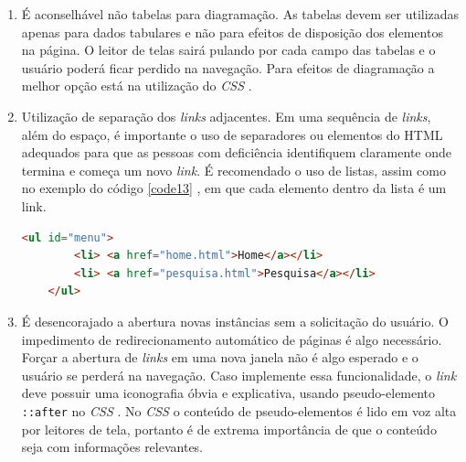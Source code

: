 {\begin{enumerate}
{\begin{lstlisting}[language=html,caption={Criação de \textit{landmarks} para acessar pontos de referências através do atalho p}, label=code12]
        <div role="main" id="conteudo"> conteúdo da main </mdiv>
        \end{lstlisting}}
    \item É aconselhável não tabelas para diagramação. As tabelas devem ser utilizadas apenas para dados tabulares e não para efeitos de disposição dos elementos na página. O leitor de telas sairá pulando por cada campo das tabelas e o usuário poderá ficar perdido na navegação. Para efeitos de diagramação a melhor opção está na utilização do \textit{CSS} \cite{CSS}.
    \item Utilização de separação dos \textit{links} adjacentes. Em uma sequência de \textit{links}, além do espaço, é importante o uso de separadores ou elementos do HTML \cite{HTML} adequados para que as pessoas com deficiência identifiquem claramente onde termina e começa um novo \textit{link}. É recomendado o uso de listas, assim como no exemplo do código \ref{code13} , em que cada elemento dentro da lista é um link.
    {\begin{lstlisting}[language=html,caption={Separação de \textit{links} adjacentes usando a \textit{tag} li.}, label=code13]
    <ul id="menu">
        <li> <a href="home.html">Home</a></li>
        <li> <a href="pesquisa.html">Pesquisa</a></li>
    </ul>
    \end{lstlisting}}
    \item É desencorajado a abertura novas instâncias sem a solicitação do usuário. O impedimento de  redirecionamento automático de páginas é algo necessário. Forçar a abertura de \textit{links} em uma nova janela não é algo esperado e o usuário se perderá na navegação. Caso implemente essa funcionalidade, o \textit{link} deve possuir uma iconografia óbvia e explicativa, usando pseudo-elemento \lstinline{::after} no \textit{CSS} \cite{CSS}. No \textit{CSS} \cite{CSS} o conteúdo de pseudo-elementos é lido em voz alta por leitores de tela, portanto é de extrema importância de que o conteúdo seja com informações relevantes.


\end{enumerate}}
